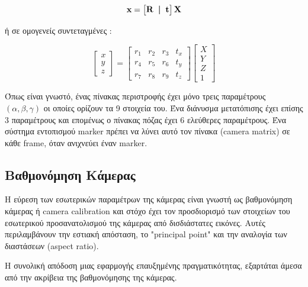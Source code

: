 \begin{equation}
\textbf{x}=
\begin{bmatrix}
\textbf{R \! | \! t}
\end{bmatrix}
\textbf{X}
\end{equation}


ή σε ομογενείς συντεταγμένες :

\begin{equation}
\begin{bmatrix}
x \\ y \\ z
\end{bmatrix}
=
\begin{bmatrix}
r_{1} & r_{2} & r_{3} & t_{x}\\
r_{4} & r_{5} & r_{6} & t_{y}\\
r_{7} & r_{8} & r_{9} & t_{z}
\end{bmatrix}
\begin{bmatrix}
X\\
Y\\
Z\\
1
\end{bmatrix}
\end{equation}

Όπως είναι γνωστό, ένας πίνακας περιστροφής έχει μόνο τρεις παραμέτρους $(\alpha, \beta, \gamma)$ οι οποίες ορίζουν τα 9 στοιχεία του. Ένα διάνυσμα μετατόπισης έχει επίσης 3 παραμέτρους και επομένως ο πίνακας πόζας έχει 6 ελεύθερες παραμέτρους. Ένα σύστημα εντοπισμού marker πρέπει να λύνει αυτό τον πίνακα (camera matrix) σε κάθε frame, όταν ανιχνεύει έναν marker.









\subsection{Βαθμονόμηση Κάμερας}



Η εύρεση των εσωτερικών παραμέτρων της κάμερας είναι γνωστή ως βαθμονόμηση κάμερας ή camera calibration και στόχο έχει τον προσδιορισμό των στοιχείων του εσωτερικού προσανατολισμού της κάμερας από δισδιάστατες εικόνες. Αυτές περιλαμβάνουν την εστιακή απόσταση, το "principal point" και την αναλογία των διαστάσεων (aspect ratio). 

Η συνολική απόδοση μιας εφαρμογής επαυξημένης πραγματικότητας, εξαρτάται άμεσα από την ακρίβεια της βαθμονόμησης της κάμερας. 


